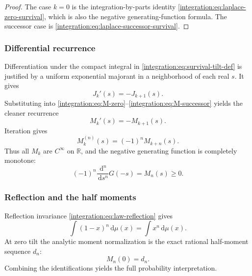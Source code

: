 \documentclass[11pt,oneside]{article}
\theoremstyle{definition}
\theoremstyle{remark}
\newcommand{\R}{\mathbb R}
\newcommand{\dd}{\,\mathrm d}
\begin{document}
\begin{proof}
The case $k=0$ is the integration-by-parts identity
\eqref{integration:eq:laplace-zero-survival}, which is also the negative generating-function formula.
The successor case is \eqref{integration:eq:laplace-successor-survival}.
\end{proof}

\subsubsection{Differential recurrence}

Differentiation under the compact integral in \eqref{integration:eq:survival-tilt-def} is justified by a
uniform exponential majorant in a neighborhood of each real $s$.  It gives
\begin{equation}
 J_k'(s)=-J_{k+1}(s).
 \label{integration:eq:J-differential-recurrence}
\end{equation}
Substituting into \eqref{integration:eq:M-zero}--\eqref{integration:eq:M-successor} yields the cleaner recurrence
\begin{equation}
 M_k'(s)=-M_{k+1}(s).
 \label{integration:eq:M-differential-recurrence}
\end{equation}
Iteration gives
\begin{equation}
 M_k^{(n)}(s)=(-1)^nM_{k+n}(s).
 \label{integration:eq:M-iterated-derivative}
\end{equation}
Thus all $M_k$ are $C^\infty$ on $\R$, and the negative generating function is completely
monotone:
\begin{equation}
 (-1)^n\frac{\dd^n}{\dd s^n}G(-s)=M_n(s)\ge0.
 \label{integration:eq:complete-monotonicity}
\end{equation}

\subsubsection{Reflection and the half moments}

Reflection invariance \eqref{integration:eq:law-reflection} gives
\begin{equation}
 \int(1-x)^n\dd\mu(x)=\int x^n\dd\mu(x).
 \label{integration:eq:endpoint-raw-reflection}
\end{equation}
At zero tilt the analytic moment normalization is the exact rational half-moment sequence
$d_n$:
\begin{equation}
 M_n(0)=d_n.
 \label{integration:eq:M-zero-half-moment}
\end{equation}
Combining the identifications yields the full probability interpretation.
\end{document}
